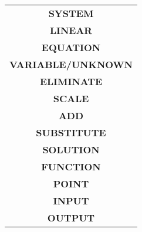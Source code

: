 \documentclass[a4paper,11pt]{article}
\begin{document}
\hfill
\begin{minipage}{.25\textwidth}
 \renewcommand{\arraystretch}{2}
 \begin{tabular}{c}
  \textbf{SYSTEM}\\
  \textbf{LINEAR}\\
  \textbf{EQUATION}\\
  \textbf{VARIABLE/UNKNOWN}\\
  \textbf{ELIMINATE}\\
  \textbf{SCALE}\\
  \textbf{ADD}\\
  \textbf{SUBSTITUTE}\\
  \textbf{SOLUTION}\\
  \textbf{FUNCTION}\\
  \textbf{POINT}\\
  \textbf{INPUT}\\
  \textbf{OUTPUT}
 \end{tabular}
\end{minipage}
\end{document}
